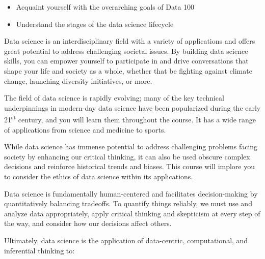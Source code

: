\documentclass[
  letterpaper,
  DIV=11,
  numbers=noendperiod]{scrreprt}
\providecommand{\tightlist}{%
  \setlength{\itemsep}{0pt}\setlength{\parskip}{0pt}}\usepackage{longtable,booktabs,array}
\begin{document}
\begin{tcolorbox}[enhanced jigsaw, colback=white, opacityback=0, coltitle=black, title=\textcolor{quarto-callout-note-color}{\faInfo}\hspace{0.5em}{Learning Outcomes}, bottomtitle=1mm, breakable, titlerule=0mm, left=2mm, colbacktitle=quarto-callout-note-color!10!white, toptitle=1mm, arc=.35mm, bottomrule=.15mm, leftrule=.75mm, rightrule=.15mm, toprule=.15mm, opacitybacktitle=0.6, colframe=quarto-callout-note-color-frame]

\begin{itemize}
\tightlist
\item
  Acquaint yourself with the overarching goals of Data 100
\item
  Understand the stages of the data science lifecycle
\end{itemize}

\end{tcolorbox}

Data science is an interdisciplinary field with a variety of
applications and offers great potential to address challenging societal
issues. By building data science skills, you can empower yourself to
participate in and drive conversations that shape your life and society
as a whole, whether that be fighting against climate change, launching
diversity initiatives, or more.

The field of data science is rapidly evolving; many of the key technical
underpinnings in modern-day data science have been popularized during
the early 21\textsuperscript{st} century, and you will learn them
throughout the course. It has a wide range of applications from science
and medicine to sports.

While data science has immense potential to address challenging problems
facing society by enhancing our critical thinking, it can also be used
obscure complex decisions and reinforce historical trends and biases.
This course will implore you to consider the ethics of data science
within its applications.

Data science is fundamentally human-centered and facilitates
decision-making by quantitatively balancing tradeoffs. To quantify
things reliably, we must use and analyze data appropriately, apply
critical thinking and skepticism at every step of the way, and consider
how our decisions affect others.

Ultimately, data science is the application of data-centric,
computational, and inferential thinking to:
\end{document}
